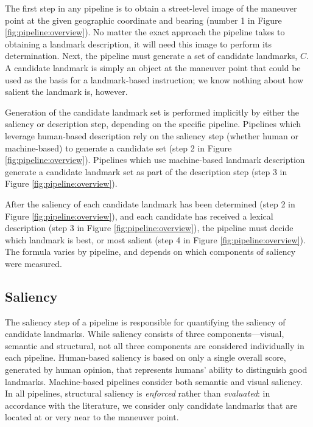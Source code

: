 The first step in any pipeline is to obtain a street-level image of the maneuver point at the given geographic coordinate and bearing (number 1 in Figure \ref{fig:pipeline:overview}). No matter the exact approach the pipeline takes to obtaining a landmark description, it will need this image to perform its determination. Next, the pipeline must generate a set of candidate landmarks, $C$. A candidate landmark is simply an object at the maneuver point that could be used as the basis for a landmark-based instruction; we know nothing about how salient the landmark is, however. 
	
Generation of the candidate landmark set is performed implicitly by either the saliency or description step, depending on the specific pipeline. Pipelines which leverage human-based description rely on the saliency step (whether human or machine-based) to generate a candidate set (step 2 in Figure \ref{fig:pipeline:overview}). Pipelines which use machine-based landmark description generate a candidate landmark set as part of the description step (step 3 in Figure \ref{fig:pipeline:overview}).

After the saliency of each candidate landmark has been determined (step 2 in Figure \ref{fig:pipeline:overview}), and each candidate has received a lexical description (step 3 in Figure \ref{fig:pipeline:overview}), the pipeline must decide which landmark is best, or most salient (step 4 in Figure \ref{fig:pipeline:overview}). The formula varies by pipeline, and depends on which components of saliency were measured.

\subsection{Saliency}
The saliency step of a pipeline is responsible for quantifying the saliency of candidate landmarks. While saliency consists of three components---visual, semantic and structural, not all three components are considered individually in each pipeline. Human-based saliency is based on only a single overall score, generated by human opinion, that represents humans' ability to distinguish good landmarks. Machine-based pipelines consider both semantic and visual saliency. In all pipelines, structural saliency is \textit{enforced} rather than \textit{evaluated}: in accordance with the literature, we consider only candidate landmarks that are located at or very near to the maneuver point.

